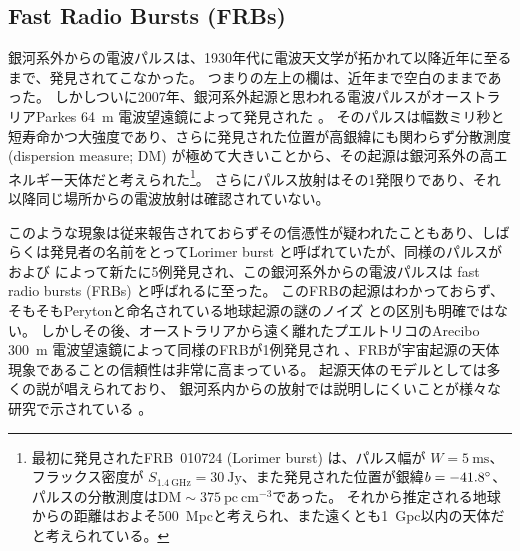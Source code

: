 \subsection{Fast Radio Bursts (FRBs)} \label{transients.s1.frb}
銀河系外からの電波パルスは、1930年代に電波天文学が拓かれて以降近年に至るまで、発見されてこなかった。
つまりの左上の欄は、近年まで空白のままであった。
しかしついに2007年、銀河系外起源と思われる電波パルスがオーストラリアParkes 64~m 電波望遠鏡によって発見された \citep{2007Sci...318..777L}。
そのパルスは幅数ミリ秒と短寿命かつ大強度であり、さらに発見された位置が高銀緯にも関わらず分散測度 (dispersion measure; DM) が極めて大きいことから、その起源は銀河系外の高エネルギー天体だと考えられた\footnote{
最初に発見されたFRB~010724 (Lorimer burst) は、パルス幅が $W=5~\text{ms}$、フラックス密度が $S_{1.4~\text{GHz}}=30~\text{Jy}$、また発見された位置が銀緯$b = -41.8\mbox{$^\circ$}$、パルスの分散測度は$\text{DM} \sim 375~\text{pc}~\text{cm}^{-3}$であった。
それから推定される地球からの距離はおよそ500~Mpcと考えられ、また遠くとも1~Gpc以内の天体だと考えられている。
}。
さらにパルス放射はその1発限りであり、それ以降同じ場所からの電波放射は確認されていない。

このような現象は従来報告されておらずその信憑性が疑われたこともあり、しばらくは発見者の名前をとってLorimer burst と呼ばれていたが、同様のパルスが \citet{2011MNRAS.415.3065K} および \citet{2013Sci...341...53T} によって新たに5例発見され、この銀河系外からの電波パルスは fast radio bursts (FRBs) と呼ばれるに至った。
このFRBの起源はわかっておらず、そもそもPerytonと命名されている地球起源の謎のノイズ \citep{2011ApJ...727...18B} との区別も明確ではない。
しかしその後、オーストラリアから遠く離れたプエルトリコのArecibo 300~m 電波望遠鏡によって同様のFRBが1例発見され \citep{2014ApJ...790..101S}、FRBが宇宙起源の天体現象であることの信頼性は非常に高まっている。
起源天体のモデルとしては多くの説が唱えられており、
銀河系内からの放射では説明しにくいことが様々な研究で示されている \citep[e.g.,][]{2014ApJ...797...70K}。

